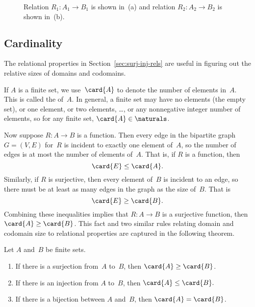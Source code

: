 \begin{figure}

\qquad
{}

\caption{Relation $R_1: A_1 \to B_1$ is shown in~(a) and relation
  $R_2: A_2 \to B_2$ is shown in~(b).}

\label{fig:7FD}

\end{figure}

\subsection{Cardinality}

The relational properties in Section~\ref{sec:surj-inj-rels} are
useful in figuring out the relative sizes of domains and codomains.

If $A$ is a finite set, we use~$\card{A}$ to denote the number of
elements in~$A$.  This is called the  of~$A$.  In
general, a finite set may have no elements (the empty set), or one
element, or two elements, \dots, or any nonnegative integer number of
elements, so for any finite set, $\card{A} \in \naturals$.

Now suppose $R: A \to B$ is a function.  Then every edge in the
bipartite graph~$G = (V, E)$ for~$R$ is incident to exactly one element of~$A$,
so the number of edges is at most the number of elements of~$A$.  That
is, if $R$ is a function, then
\begin{equation*}
    \card{E} \le \card{A}.
\end{equation*}
Similarly, if $R$ is surjective, then every element of~$B$ is incident
to an edge, so there must be at least as many edges in the graph as
the size of~$B$.  That is
\begin{equation*}
    \card{E} \ge \card{B}.
\end{equation*}
Combining these inequalities implies that $R : A \to B$ is a
surjective function, then $\card{A} \ge \card{B}$.  This fact and two
similar rules relating domain and codomain size to relational
properties are captured in the following theorem.

\begin{theorem}\label{thm:relational_rules}\label{thm:PA}
Let $A$ and~$B$ be finite sets.
\begin{enumerate}

\item\label{mr:1}
If there is a surjection from~$A$ to~$B$, then $\card{A} \ge
\card{B}$.

\item\label{mapping-inj}
If there is an injection from $A$ to~$B$, then $\card{A} \le
\card{B}.$

\item\label{mr:3}
If there is a bijection between $A$ and~$B$, then $\card{A} =
\card{B}$.

\end{enumerate}
\end{theorem}

